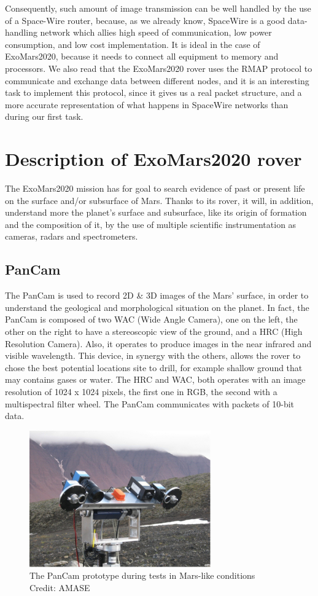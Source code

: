 \documentclass[12pt,a4paper]{article}
\begin{document}
Consequently, such amount of image transmission can be well handled by the use of a Space-Wire router, because, as we already know, SpaceWire is a good data-handling network which allies high speed of communication, low power consumption, and low cost implementation. It is ideal in the case of ExoMars2020, because it needs to connect all equipment to memory and processors. We also read that the ExoMars2020 rover uses the RMAP protocol to communicate and exchange data between different nodes, and it is an interesting task to implement this protocol, since it gives us a real packet structure, and a more accurate representation of what happens in SpaceWire networks than during our first task.\pagebreak
\section{Description of ExoMars2020 rover}

The ExoMars2020 mission has for goal to search evidence of past or present life on the surface and/or subsurface of Mars. Thanks to its rover, it will, in addition, understand more the planet's surface and subsurface, like its origin of formation and the composition of it, by the use of multiple scientific instrumentation as cameras, radars and spectrometers.\smallbreak

\subsection{PanCam}
The PanCam is used to record 2D \& 3D images of the Mars' surface, in order to understand the geological and morphological situation on the planet. In fact, the PanCam is composed of two WAC (Wide Angle Camera), one on the left, the other on the right to have a stereoscopic view of the ground, and a HRC (High Resolution Camera). Also, it operates to produce images in the near infrared and visible wavelength. This device, in synergy with the others, allows the rover to chose the best potential locations site to drill, for example shallow ground that may contains gases or water. The HRC and WAC, both operates with an image resolution of 1024 x 1024 pixels, the first one in RGB, the second with a multispectral filter wheel. The PanCam communicates with packets of 10-bit data.

\begin{figure}[h]
\centering
\includegraphics[scale=1]{pictures/PanCam.jpg}
\caption{The PanCam prototype during tests in Mars-like conditions\\Credit: AMASE}
\end{figure}
\end{document}
